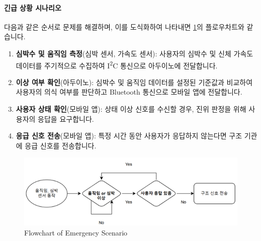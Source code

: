 \documentclass[12pt]{article}
\begin{document}
            \paragraph{긴급 상황 시나리오}다음과 같은 순서로 문제를 해결하며, 이를 도식화하여 나타내면 \cref{flow2}의 플로우차트와 같습니다.
            \begin{enumerate}
                \item \textbf{심박수 및 움직임 측정}(심박 센서, 가속도 센서): 사용자의 심박수 및 신체 가속도 데이터를 주기적으로 수집하여 I\textsuperscript{2}C 통신으로 아두이노에 전달합니다.
                \item \textbf{이상 여부 확인}(아두이노): 심박수 및 움직임 데이터를 설정된 기준값과 비교하여 사용자의 의식 여부를 판단하고 Bluetooth 통신으로 모바일 앱에 전달합니다.
                \item \textbf{사용자 상태 확인}(모바일 앱): 상태 이상 신호를 수신할 경우, 진위 판정을 위해 사용자의 응답을 요구합니다.
                \item \textbf{응급 신호 전송}(모바일 앱): 특정 시간 동안 사용자가 응답하지 않는다면 구조 기관에 응급 신호를 전송합니다.
            \end{enumerate}
            \begin{figure}
                \centering
                \includegraphics[width=.8\linewidth]{flow2.png}
                \caption{Flowchart of Emergency Scenario}
                \label{flow2}
            \end{figure}
\end{document}
